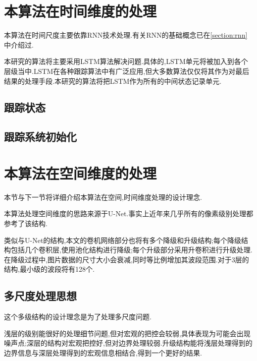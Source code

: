 \section{本算法在时间维度的处理}
\par
本算法在时间尺度主要依靠RNN技术处理.有关RNN的基础概念已在\ref{section:rnn}中介绍过.
\par
本研究的算法将主要采用LSTM算法解决问题.具体的,LSTM单元将被加入到各个层级当中.LSTM在各种跟踪算法中有广泛应用,但大多数算法仅仅将其作为对最后结果的处理手段.本研究的算法将把LSTM作为所有的中间状态记录单元.
\subsection{跟踪状态}
\subsection{跟踪系统初始化}

\section{本算法在空间维度的处理}
本节与下一节将详细介绍本算法在空间,时间维度处理的设计理念.
\par
本算法处理空间维度的思路来源于U-Net\supercite{ronneberger2015u}.事实上近年来几乎所有的像素级别处理都参考了该结构.
\par
类似与U-Net的结构,本文的卷机网络部分也将有多个降级和升级结构;每个降级结构包括几个卷积层,使用池化结构进行降级;每个升级部分采用升卷积进行升级处理.在降级过程中,图片数据的尺寸大小会衰减,同时等比例增加其波段范围.对于3层的结构,最小级的波段将有128个.

\subsection{多尺度处理思想}
这个多级结构的设计理念是为了处理多尺度问题.
\par
浅层的级别能很好的处理细节问题,但对宏观的把控会较弱,具体表现为可能会出现噪声点;深层的结构对宏观把控好,但对边界处理较弱.升级结构能将浅层处理得到的边界信息与深层处理得到的宏观信息相结合,得到一个更好的结果.